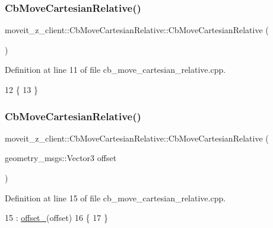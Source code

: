 \subsubsection{\texorpdfstring{Cb\+Move\+Cartesian\+Relative()}{CbMoveCartesianRelative()}\hspace{0.1cm}{\footnotesize\ttfamily [1/2]}}
{\footnotesize\ttfamily moveit\+\_\+z\+\_\+client\+::\+Cb\+Move\+Cartesian\+Relative\+::\+Cb\+Move\+Cartesian\+Relative (\begin{DoxyParamCaption}{ }\end{DoxyParamCaption})}



Definition at line 11 of file cb\+\_\+move\+\_\+cartesian\+\_\+relative.\+cpp.


\begin{DoxyCode}
12 \{
13 \}
\end{DoxyCode}
\mbox{\label{classmoveit__z__client_1_1CbMoveCartesianRelative_a07c04dffa04c5cd30d46109ed2167932}} 
\subsubsection{\texorpdfstring{Cb\+Move\+Cartesian\+Relative()}{CbMoveCartesianRelative()}\hspace{0.1cm}{\footnotesize\ttfamily [2/2]}}
{\footnotesize\ttfamily moveit\+\_\+z\+\_\+client\+::\+Cb\+Move\+Cartesian\+Relative\+::\+Cb\+Move\+Cartesian\+Relative (\begin{DoxyParamCaption}\item[{geometry\+\_\+msgs\+::\+Vector3}]{offset }\end{DoxyParamCaption})}



Definition at line 15 of file cb\+\_\+move\+\_\+cartesian\+\_\+relative.\+cpp.


\begin{DoxyCode}
15                                                                             : 
      \hyperlink{classmoveit__z__client_1_1CbMoveCartesianRelative_aa5316f2f734336722a353a8e9addea95}{offset\_}(offset)
16 \{
17 \}
\end{DoxyCode}


